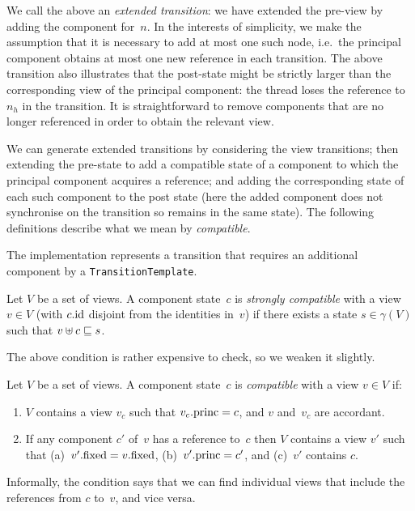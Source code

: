 %
%
We call the above an \emph{extended transition}: we have extended the pre-view
by adding the component for~$n$.  In the interests of simplicity, we make the
assumption that it is necessary to add at most one such node, i.e.~the
principal component obtains at most one new reference in each transition.
The above transition also illustrates that the post-state might be strictly
larger than the corresponding view of the principal component: the thread
loses the reference to~$n_h$ in the transition.  It is straightforward to remove
components that are no longer referenced in order to obtain the relevant view.

We can generate extended transitions by considering the view transitions; then
extending the pre-state to add a compatible state of a component to which the
principal component acquires a reference; and adding the corresponding state
of each such component to the post state (here the added component does not
synchronise on the transition so remains in the same state).  The following
definitions describe what we mean by \emph{compatible}.

\begin{impNote}
The implementation represents a transition that requires an
  additional component by a \texttt{TransitionTemplate}.
\end{impNote}

\begin{definition}
Let $V$ be a set of views.  A component state~$c$ is \emph{strongly
  compatible} with a view~$v \in V$ (with $c.\mathrm{id}$ disjoint from the identities
in~$v$) if there exists a state $s \in \gamma(V)$ such that $v \uplus c \sqsubseteq
s$.
\end{definition}
%
The above condition is rather expensive to check, so we weaken it slightly. 
%
\begin{definition}
\label{def:compatible}
Let $V$ be a set of views.  A component state~$c$ is \emph{compatible} with a
view $v \in V$ if:
%
\begin{enumerate}
\item\label{item:compatible-1} $V$ contains a view $v_c$ such that $v_c.\mathrm{princ}
  = c$, and $v$ and~$v_c$ are accordant.


\item\label{item:compatible-2} If any component $c'$ of~$v$ has a reference
  to~$c$ then $V$ contains a view $v'$ such that (a)~$v'.\mathrm{fixed} = v.\mathrm{fixed}$,
  (b)~$v'.\mathrm{princ} = c'$, and (c)~$v'$ contains $c$.
\end{enumerate}
\end{definition}
%
Informally, the condition says that we can find individual views that include
the references from $c$ to~$v$, and vice versa. 

